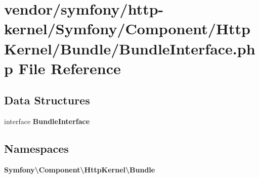 \section{vendor/symfony/http-\/kernel/\+Symfony/\+Component/\+Http\+Kernel/\+Bundle/\+Bundle\+Interface.php File Reference}
\label{_bundle_interface_8php}
\subsection*{Data Structures}
\begin{DoxyCompactItemize}
\item 
interface {\bf Bundle\+Interface}
\end{DoxyCompactItemize}
\subsection*{Namespaces}
\begin{DoxyCompactItemize}
\item 
 {\bf Symfony\textbackslash{}\+Component\textbackslash{}\+Http\+Kernel\textbackslash{}\+Bundle}
\end{DoxyCompactItemize}
